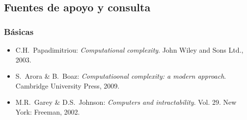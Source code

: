 \subsection{Fuentes de apoyo y consulta}
\subsubsection{B\'{a}sicas}

\begin{itemize}[itemsep=0em]
  
\item{C.H.\ {\sc Papadimitriou}: {\em Computational complexity}. John
    Wiley and Sons Ltd., 2003.}
  
\item{S.\ {\sc Arora} \& B.\ {\sc Boaz}: {\em Computatioonal complexity:
      a modern approach}. Cambridge University Press, 2009.}
  
\item{M.R.\ {\sc Garey} \& D.S.\ {\sc Johnson}: {\em Computers and
      intractability}. Vol. 29. New York: Freeman, 2002.}
  
\end{itemize}



\label{final} %


